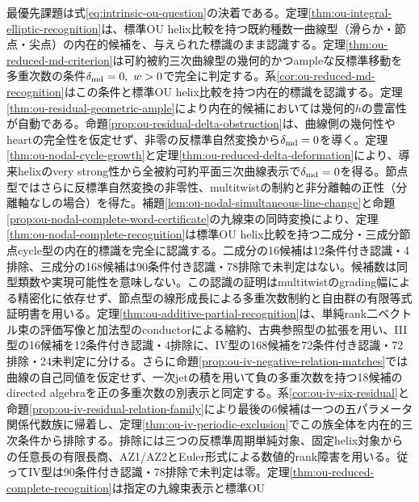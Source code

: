 \documentclass[11pt,a4paper]{ltjsarticle}
\theoremstyle{definition}
\begin{document}
最優先課題は式\eqref{eq:intrinsic-ou-question}の決着である。定理\ref{thm:ou-integral-elliptic-recognition}は、標準OU helix比較を持つ既約種数一曲線型（滑らか・節点・尖点）の内在的候補を、与えられた標識のまま認識する。定理\ref{thm:ou-reduced-md-criterion}は可約被約三次曲線型の幾何的かつampleな反標準移動を多重次数の条件$\delta_{\rm md}=0,\ w>0$で完全に判定する。系\ref{cor:ou-reduced-md-recognition}はこの条件と標準OU helix比較を持つ内在的標識を認識する。定理\ref{thm:ou-residual-geometric-ample}により内在的候補においては幾何的$h$の豊富性が自動である。命題\ref{prop:ou-residual-delta-obstruction}は、曲線側の幾何性やheartの完全性を仮定せず、非零の反標準自然変換から$\delta_{\rm md}=0$を導く。定理\ref{thm:ou-nodal-cycle-growth}と定理\ref{thm:ou-reduced-delta-deformation}により、導来helixのvery strong性から全被約可約平面三次曲線表示で$\delta_{\rm md}=0$を得る。節点型ではさらに反標準自然変換の非零性、multitwistの制約と非分離軸の正性（分離軸なしの場合）を得た。補題\ref{lem:ou-nodal-simultaneous-line-change}と命題\ref{prop:ou-nodal-complete-word-certificate}の九線束の同時変換により、定理\ref{thm:ou-nodal-complete-recognition}は標準OU helix比較を持つ二成分・三成分節点cycle型の内在的標識を完全に認識する。二成分の16候補は12条件付き認識・4排除、三成分の168候補は90条件付き認識・78排除で未判定はない。候補数は同型類数や実現可能性を意味しない。この認識の証明はmultitwistのgrading幅による精密化に依存せず、節点型の線形成長による多重次数制約と自由群の有限等式証明書を用いる。定理\ref{thm:ou-additive-partial-recognition}は、単純rank二ベクトル束の評価写像と加法型のconductorによる縮約、古典参照型の拡張を用い、III型の16候補を12条件付き認識・4排除に、IV型の168候補を72条件付き認識・72排除・24未判定に分ける。さらに命題\ref{prop:ou-iv-negative-relation-matches}では曲線の自己同値を仮定せず、一次jetの積を用いて負の多重次数を持つ18候補のdirected algebraを正の多重次数の別表示と同定する。系\ref{cor:ou-iv-six-residual}と命題\ref{prop:ou-iv-residual-relation-family}により最後の6候補は一つの五パラメータ関係代数族に帰着し、定理\ref{thm:ou-iv-periodic-exclusion}でこの族全体を内在的三次条件から排除する。排除には三つの反標準周期単純対象、固定helix対象からの任意長の有限長商、AZ1/AZ2とEuler形式による数値的rank障害を用いる。従ってIV型は90条件付き認識・78排除で未判定は零。定理\ref{thm:ou-reduced-complete-recognition}は指定の九線束表示と標準OU 
\end{document}
